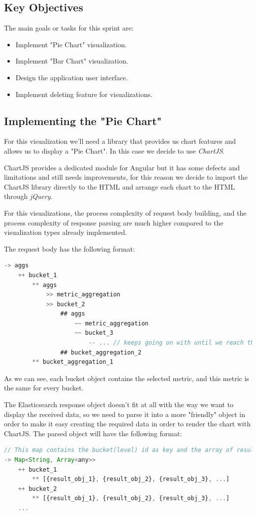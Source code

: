 \documentclass[a4paper, 12pt, english]{book}
\begin{document}
\subsection{Key Objectives}
\label{sec:key-objectives}
The main goals or tasks for this sprint are:
\begin{itemize}
    \item Implement "Pie Chart" visualization.
    \item Implement "Bar Chart" visualization.
    \item Design the application user interface.
    \item Implement deleting feature for visualizations.
\end{itemize}

\subsection{Implementing the "Pie Chart"}
\label{sec:pie-chart}
For this visualization we'll need a library that provides us chart features and allows us to display a "Pie Chart". In this case we decide to use \textit{ChartJS}.

ChartJS provides a dedicated module for Angular but it has some defects and limitations and still needs improvements, for this reason we decide to import the ChartJS library directly to the HTML and arrange each chart to the HTML through \textit{jQuery}.

For this visualizations, the process complexity of request body building, and the process complexity of response parsing are much higher compared to the visualization types already implemented.

The request body has the following format:
\begin{lstlisting}[language=javascript]
-> aggs
    ++ bucket_1
        ** aggs
            >> metric_aggregation
            >> bucket_2
                ## aggs
                    ~~ metric_aggregation
                    ~~ bucket_3
                        -- ... // keeps going on with until we reach the desired number of levels
                ## bucket_aggregation_2
        ** bucket_aggregation_1
\end{lstlisting}

As we can see, each bucket object contains the selected metric, and this metric is the same for every bucket.

The Elasticsearch response object doesn't fit at all with the way we want to display the received data, so we need to parse it into a more "friendly" object in order to make it easy creating the required data in order to render the chart with ChartJS. The parsed object will have the following format:
\begin{lstlisting}[language=javascript, caption=Custom results object, label=code:cutom-pie-chart-obj]
// This map contains the bucket(level) id as key and the array of results as value.
-> Map<String, Array<any>>
    ++ bucket_1
        ** [{result_obj_1}, {result_obj_2}, {result_obj_3}, ...]
    ++ bucket_2
        ** [{result_obj_1}, {result_obj_2}, {result_obj_3}, ...]
    ...

\end{lstlisting}
\end{document}
